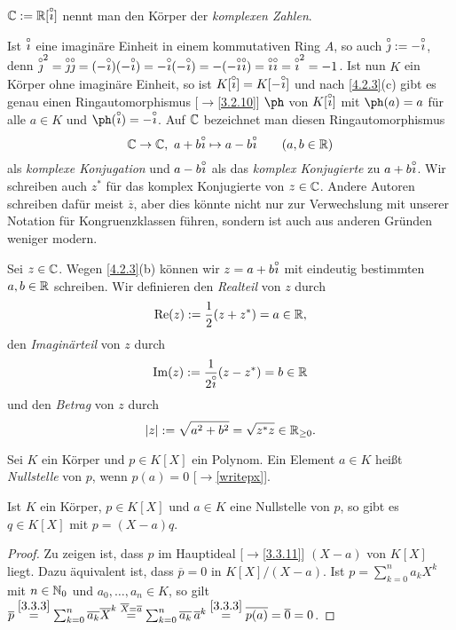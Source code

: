 \documentclass[../../main.tex]{subfiles}
\begin{document}
\begin{df}\label{4.2.6}
$\mathbb C:=\mathbb R[\overset\circ\imath]$ nennt man den Körper der \emph{komplexen Zahlen}.
\end{df}

\begin{bem}\label{4.2.7}
Ist $\overset\circ\imath$ eine imaginäre Einheit in einem kommutativen Ring $A$, so auch $\overset\circ\jmath:=-\overset\circ\imath$, denn $\overset\circ\jmath^2=\overset\circ\jmath\overset\circ\jmath=(-\overset\circ\imath)(-\overset\circ\imath)=-\overset\circ\imath(-\overset\circ\imath)=-(-\overset\circ\imath\overset\circ\imath)=\overset\circ\imath\overset\circ\imath=\overset\circ\imath^2=-1$. Ist nun $K$ ein Körper ohne imaginäre Einheit,
so ist $K[\overset\circ\imath]=K[-\overset\circ\imath]$ und nach \ref{4.2.3}(c) gibt es genau
einen Ringautomorphismus [$\to$\ref{3.2.10}] $\ph$ von $K[\overset\circ\imath]$ mit $\ph(a)=a$ für alle $a\in K$ und $\ph(\i)=-\i$. Auf $\mathbb C$ bezeichnet man
diesen Ringautomorphismus $$\mathbb C\to\mathbb C,\ a+b\overset\circ\imath\mapsto a-b\overset\circ\imath\qquad(a,b\in\mathbb R)$$  als \emph{komplexe Konjugation} und $a-b\overset\circ\imath$ als das \emph{komplex Konjugierte} zu $a+b\overset\circ\imath$.
Wir schreiben auch $z^*$ für das komplex Konjugierte von $z\in\mathbb C$. Andere Autoren schreiben dafür meist $\overline z$, aber dies könnte nicht nur zur Verwechslung mit unserer Notation für Kongruenzklassen führen, sondern ist auch aus anderen Gründen weniger modern.
\end{bem}

\begin{df}\label{4.2.8}
Sei $z\in\mathbb C$. Wegen \ref{4.2.3}(b) können wir $z=a+b\overset\circ\imath$ mit eindeutig bestimmten $a,b\in\mathbb R$ schreiben. Wir definieren den \emph{Realteil} von $z$ durch
$$\operatorname{Re}(z):=\frac12(z+z^*)=a\in\mathbb R,$$
den \emph{Imaginärteil} von $z$ durch $$\operatorname{Im}(z):=\frac1{2\overset\circ\imath}(z-z^*)=b\in\mathbb R$$ und den \emph{Betrag}
von $z$ durch $$|z|:=\sqrt{a^2+b^2}=\sqrt{z^*z}\in\mathbb R_{\ge0}.$$
\end{df}

\begin{df}\label{4.2.9}
Sei $K$ ein Körper und $p\in K[X]$ ein Polynom. Ein Element $a\in K$ heißt \emph{Nullstelle} von $p$, wenn $p(a)=0$ [$\to$\ref{writepx}].
\end{df}

\begin{pro}\label{4.2.10}
Ist $K$ ein Körper, $p\in K[X]$ und $a\in K$ eine Nullstelle von $p$, so gibt es $q\in K[X]$ mit $p=(X-a)q$.
\end{pro}
\begin{proof}
Zu zeigen ist, dass $p$ im Hauptideal [$\to$\ref{3.3.11}] $(X-a)$ von $K[X]$ liegt. Dazu äquivalent ist, dass $\overline p=0$ in $K[X]/(X-a)$. Ist $p=\sum_{k=0}^na_kX^k$ mit
$n\in\mathbb N_0$ und $a_0,\dots,a_n\in K$, so gilt $\overline p\overset{\ref{3.3.3}}=\sum_{k=0}^n\overline{a_k}\overline X^k\overset{\overline X=\overline a}=
 \sum_{k=0}^n\overline{a_k}\,\overline a^k\overset{\ref{3.3.3}}=\overline{p(a)}=\overline0=0$.
\end{proof}
\end{document}
